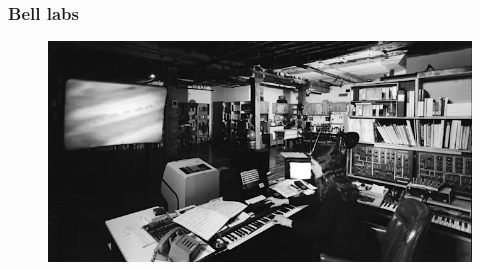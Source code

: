 \documentclass[t,aspectratio=169]{beamer}
\begin{document}
\begin{frame}
    \frametitle{Bell labs}
    \begin{figure}
        \begin{centering}
            \includegraphics[height=0.7\textheight]{bell-labs}
        \end{centering}
    \end{figure}
\end{frame}
\end{document}

